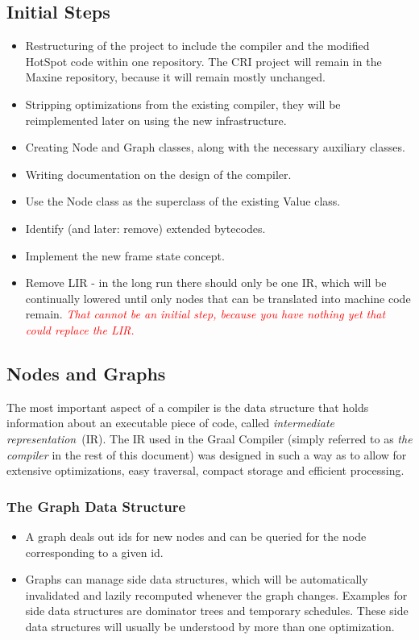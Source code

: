\documentclass[twocolumn]{svjour3}
\newcommand{\mynote}[2]{
\textcolor{red}{\fbox{\bfseries\sffamily\scriptsize#1}
  {\small\textsf{\emph{#2}}}
\fbox{\bfseries\sffamily\scriptsize }}}
\newcommand\cw[1]{\mynote{CW}{#1}}
\begin{document}
\subsection{Initial Steps}
\begin{itemize}
    \item Restructuring of the project to include the compiler and the modified HotSpot code within one repository. The CRI project will remain in the Maxine repository, because it will remain mostly unchanged.
    \item Stripping optimizations from the existing compiler, they will be reimplemented later on using the new infrastructure.
    \item Creating Node and Graph classes, along with the necessary auxiliary classes.
    \item Writing documentation on the design of the compiler.
    \item Use the Node class as the superclass of the existing Value class.
    \item Identify (and later: remove) extended bytecodes.
    \item Implement the new frame state concept.
    \item Remove LIR - in the long run there should only be one IR, which will be continually lowered until only nodes that can be translated into machine code remain. \cw{That cannot be an initial step, because you have nothing yet that could replace the LIR.}
\end{itemize}

\subsection{Nodes and Graphs}
The most important aspect of a compiler is the data structure that holds information about an executable piece of code, called \emph{intermediate representation}~(IR).
The IR used in the Graal Compiler (simply referred to as \emph{the compiler} in the rest of this document) was designed in such a way as to allow for extensive optimizations, easy traversal, compact storage and efficient processing.

\subsubsection{The Graph Data Structure}
\begin{itemize}
    \item A graph deals out ids for new nodes and can be queried for the node corresponding to a given id.
    \item Graphs can manage side data structures, which will be automatically invalidated and lazily recomputed whenever the graph changes. Examples for side data structures are dominator trees and temporary schedules. These side data structures will usually be understood by more than one optimization.
\end{itemize}
\end{document}
